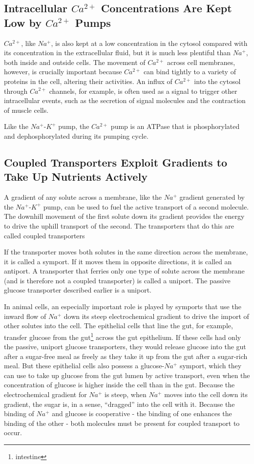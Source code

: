 \subsection{Intracellular $Ca^{2+}$ Concentrations Are Kept Low by $Ca^{2+}$ Pumps}

$Ca^{2+}$, like $Na^{+}$, is also kept at a low concentration in the cytosol compared
with its concentration in the extracellular fluid, but it is much less plentiful
than $Na^{+}$, both inside and outside cells. The movement of $Ca^{2+}$ across
cell membranes, however, is crucially important because $Ca^{2+}$ can bind
tightly to a variety of proteins in the cell, altering their activities. An influx
of $Ca^{2+}$ into the cytosol through $Ca^{2+}$ channels, for example, is often used
as a signal to trigger other intracellular events, such as the secretion of
signal molecules and the contraction of muscle cells.


Like the $Na^{+}$-$K^{+}$ pump, the $Ca^{2+}$ pump is an ATPase that is phosphorylated and dephosphorylated during its pumping cycle.

\subsection{Coupled Transporters Exploit Gradients to Take Up Nutrients Actively}

A gradient of any solute across a membrane, like the $Na^{+}$ gradient generated
by the $Na^{+}$-$K^{+}$ pump, can be used to fuel the active transport of
a second molecule. The downhill movement of the first solute down its
gradient provides the energy to drive the uphill transport of the second.
The transporters that do this are called coupled transporters

If the transporter moves both solutes in the same direction across the membrane,
it is called a symport. If it moves them in opposite directions,
it is called an antiport. A transporter that ferries only one type of
solute across the membrane (and is therefore not a coupled transporter)
is called a uniport. The passive glucose transporter described earlier is a uniport.

In animal cells, an especially important role is played by symports that
use the inward flow of $Na^{+}$ down its steep electrochemical gradient to
drive the import of other solutes into the cell. The epithelial cells that line
the gut, for example, transfer glucose from the gut\footnote{intestine} across the gut epithelium.
If these cells had only the passive, uniport glucose transporters,
they would release glucose into the gut after a sugar-free meal as freely
as they take it up from the gut after a sugar-rich meal. But these epithelial
cells also possess a glucose-$Na^{+}$ symport, which they can use to take up
glucose from the gut lumen by active transport, even when the concentration of
glucose is higher inside the cell than in the gut. Because the
electrochemical gradient for $Na^{+}$ is steep, when $Na^{+}$ moves into the cell
down its gradient, the sugar is, in a sense, “dragged” into the cell with it.
Because the binding of $Na^{+}$ and glucose is cooperative -
the binding of one enhances the binding of the other - both molecules
must be present for coupled transport to occur.


